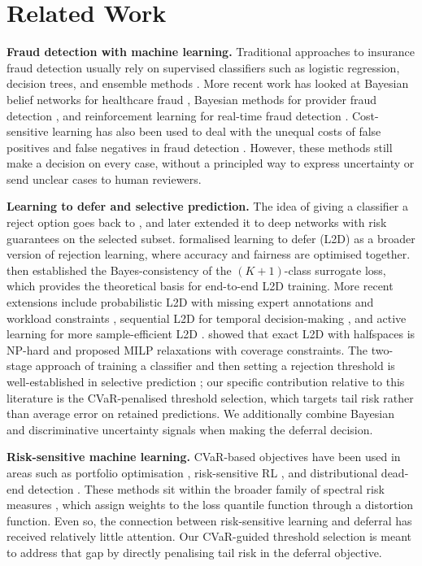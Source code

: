 \section{Related Work}
\label{sec:related}

\textbf{Fraud detection with machine learning.}
Traditional approaches to insurance fraud detection usually rely on supervised classifiers such as logistic regression, decision trees, and ensemble methods \citep{phua2010comprehensive}. More recent work has looked at Bayesian belief networks for healthcare fraud \citep{kumaraswamy2024bayesian}, Bayesian methods for provider fraud detection \citep{ekin2013bayesian}, and reinforcement learning for real-time fraud detection \citep{saddi2024realtime}. Cost-sensitive learning has also been used to deal with the unequal costs of false positives and false negatives in fraud detection \citep{phua2010comprehensive}. However, these methods still make a decision on every case, without a principled way to express uncertainty or send unclear cases to human reviewers.

\textbf{Learning to defer and selective prediction.}
The idea of giving a classifier a reject option goes back to \citet{chow1957optimum}, and \citet{geifman2017selective} later extended it to deep networks with risk guarantees on the selected subset. \citet{madras2018predict} formalised learning to defer (L2D) as a broader version of rejection learning, where accuracy and fairness are optimised together. \citet{mozannar2020consistent} then established the Bayes-consistency of the $(K{+}1)$-class surrogate loss, which provides the theoretical basis for end-to-end L2D training. More recent extensions include probabilistic L2D with missing expert annotations and workload constraints \citep{nguyen2025probabilistic}, sequential L2D for temporal decision-making \citep{joshi2023sequential}, and active learning for more sample-efficient L2D \citep{charusaie2022sample}. \citet{mozannar2023exact} showed that exact L2D with halfspaces is NP-hard and proposed MILP relaxations with coverage constraints. The two-stage approach of training a classifier and then setting a rejection threshold is well-established in selective prediction \citep{geifman2017selective}; our specific contribution relative to this literature is the CVaR-penalised threshold selection, which targets tail risk rather than average error on retained predictions. We additionally combine Bayesian and discriminative uncertainty signals when making the deferral decision.

\textbf{Risk-sensitive machine learning.}
CVaR-based objectives have been used in areas such as portfolio optimisation \citep{rockafellar2000optimization}, risk-sensitive RL \citep{tamar2015optimizing}, and distributional dead-end detection \citep{killian2023risk}. These methods sit within the broader family of spectral risk measures \citep{acerbi2002spectral}, which assign weights to the loss quantile function through a distortion function. Even so, the connection between risk-sensitive learning and deferral has received relatively little attention. Our CVaR-guided threshold selection is meant to address that gap by directly penalising tail risk in the deferral objective.

